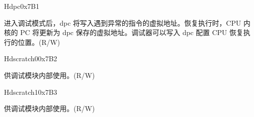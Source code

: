 \begin{register}{H}{dpc}{0x7B1}
\label{regdesc:DPC}
%
\regnewline%
\begin{regdesc}
\begin{reglist}
\label{fielddesc:DPC}\item [dpc] 进入调试模式后，dpc 将写入遇到异常的指令的虚拟地址。恢复执行时，CPU 内核的 PC 将更新为 dpc 保存的虚拟地址。调试器可以写入 dpc 配置 CPU 恢复执行的位置。(R/W)
\end{reglist}
\end{regdesc}
\end{register}

\begin{register}{H}{dscratch0}{0x7B2}
\label{regdesc:DSCRATCH0}
%
\regnewline%
\begin{regdesc}
\begin{reglist}
\label{fielddesc:DSCRATCH0}\item [dscratch0] 供调试模块内部使用。(R/W)
\end{reglist}
\end{regdesc}
\end{register}

\begin{register}{H}{dscratch1}{0x7B3}
\label{regdesc:DSCRATCH1}
%
\regnewline%
\begin{regdesc}
\begin{reglist}
\label{fielddesc:DSCRATCH1}\item [dscratch1] 供调试模块内部使用。(R/W)
\end{reglist}
\end{regdesc}
\end{register}
